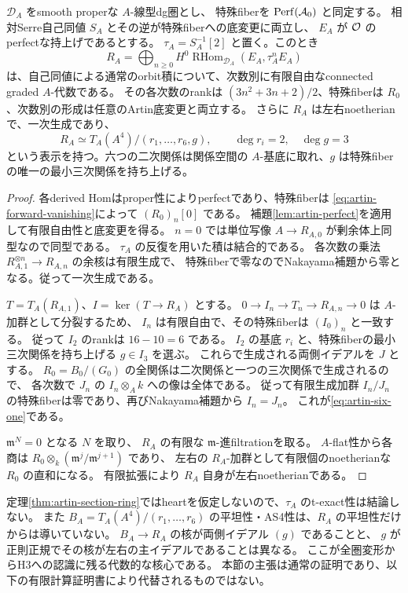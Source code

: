 \begin{theorem}[全Artin底での反標準環の平坦な有限表示]\label{thm:artin-section-ring}
$\mathcal D_A$ をsmooth properな $A$-線型dg圏とし、
特殊fiberを $\operatorname{Perf}(\mathcal A_0)$ と同定する。
相対Serre自己同値 $S_A$ とその逆が特殊fiberへの底変更に両立し、
$E_A$ が $\mathcal O$ のperfectな持上げであるとする。
$\tau_A=S_A^{-1}[2]$ と置く。このとき
\[
 R_A=\bigoplus_{n\ge0}H^0\operatorname{RHom}_{\mathcal D_A}(E_A,\tau_A^n E_A)
\]
は、自己同値による通常のorbit積について、次数別に有限自由なconnected graded $A$-代数である。
その各次数のrankは $(3n^2+3n+2)/2$、特殊fiberは $R_0$、次数別の形成は任意のArtin底変更と両立する。
さらに $R_A$ は左右noetherianで、一次生成であり、
\begin{equation}\label{eq:artin-six-one}
 R_A\simeq T_A(A^4)/(r_1,\ldots,r_6,g),\qquad \deg r_i=2,\quad\deg g=3
\end{equation}
という表示を持つ。六つの二次関係は関係空間の $A$-基底に取れ、$g$ は特殊fiberの唯一の最小三次関係を持ち上げる。
\end{theorem}
\begin{proof}
各derived Homはproper性によりperfectであり、特殊fiberは
\eqref{eq:artin-forward-vanishing}によって $(R_0)_n[0]$ である。
補題\ref{lem:artin-perfect}を適用して有限自由性と底変更を得る。
$n=0$ では単位写像 $A\to R_{A,0}$ が剰余体上同型なので同型である。
$\tau_A$ の反復を用いた積は結合的である。
各次数の乗法 $R_{A,1}^{\otimes n}\to R_{A,n}$ の余核は有限生成で、
特殊fiberで零なのでNakayama補題から零となる。従って一次生成である。

$T=T_A(R_{A,1})$、$I=\ker(T\to R_A)$ とする。
$0\to I_n\to T_n\to R_{A,n}\to0$ は $A$-加群として分裂するため、
$I_n$ は有限自由で、その特殊fiberは $(I_0)_n$ と一致する。
従って $I_2$ のrankは $16-10=6$ である。
$I_2$ の基底 $r_i$ と、特殊fiberの最小三次関係を持ち上げる $g\in I_3$ を選ぶ。
これらで生成される両側イデアルを $J$ とする。
$R_0=B_0/(G_0)$ の全関係は二次関係と一つの三次関係で生成されるので、
各次数で $J_n$ の $I_n\otimes_Ak$ への像は全体である。
従って有限生成加群 $I_n/J_n$ の特殊fiberは零であり、再びNakayama補題から $I_n=J_n$。
これが\eqref{eq:artin-six-one}である。

$\mathfrak m^N=0$ となる $N$ を取り、
$R_A$ の有限な $\mathfrak m$-進filtrationを取る。
$A$-flat性から各商は
$R_0\otimes_k(\mathfrak m^j/\mathfrak m^{j+1})$ であり、
左右の $R_A$-加群として有限個のnoetherianな $R_0$ の直和になる。
有限拡張により $R_A$ 自身が左右noetherianである。
\end{proof}

\begin{remark}[残っている再構成条件]\label{rem:artin-gap}
定理\ref{thm:artin-section-ring}ではheartを仮定しないので、$\tau_A$ のt-exact性は結論しない。
また $B_A=T_A(A^4)/(r_1,\ldots,r_6)$ の平坦性・AS4性は、$R_A$ の平坦性だけからは導いていない。
$B_A\to R_A$ の核が両側イデアル $(g)$ であることと、
$g$ が正則正規でその核が左右の主イデアルであることは異なる。
ここが全圏変形からH3への認識に残る代数的な核心である。
本節の主張は通常の証明であり、以下の有限計算証明書により代替されるものではない。
\end{remark}


